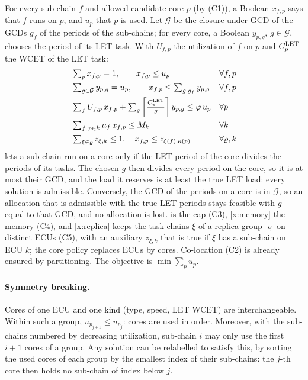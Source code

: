For every sub-chain $f$ and allowed candidate core $p$ (by (C1)), a Boolean
$x_{f,p}$ says that $f$ runs on $p$, and $u_p$ that $p$ is used. Let
$\mathcal{G}$ be the closure under GCD of the GCDs $g_f$ of the periods of
the sub-chains; for every core, a Boolean $y_{p,g}$, $g\in\mathcal{G}$,
chooses the period of its LET task. With $U_{f,p}$ the utilization of $f$
on $p$ and $C^{\mathrm{LET}}_p$ the WCET of the LET task:
\begin{align}
&\textstyle\sum_{p}x_{f,p}=1, \qquad x_{f,p}\le u_p &&\forall f,p\label{x:assign}\\
&\textstyle\sum_{g\in\mathcal{G}}y_{p,g}=u_p,\qquad
	x_{f,p}\le\sum_{g\mid g_f}y_{p,g} &&\forall f,p\label{x:let}\\
&\textstyle\sum_{f}U_{f,p}\,x_{f,p}+\sum_{g}\left\lceil \frac{C^{\mathrm{LET}}_p}{g} \right\rceil y_{p,g}
	\le\varphi\,u_p &&\forall p\label{x:load}\\
&\textstyle\sum_{f,\,p\in k}\mu_f\,x_{f,p}\le M_k &&\forall k\label{x:memory}\\
&\textstyle\sum_{\xi\in\varrho}z_{\xi,k}\le1,\quad x_{f,p}\le z_{\xi(f),\kappa(p)}
	&&\forall\varrho,k\label{x:replica}
\end{align}
 lets a sub-chain run on a core only if the LET period of the
core divides the periods of its tasks. The chosen $g$ then divides every
period on the core, so it is at most their GCD, and the load it reserves is
at least the true LET load: every solution is admissible. Conversely, the
GCD of the periods on a core is in $\mathcal{G}$, so an allocation that is
admissible with the true LET periods stays feasible with $g$ equal to that
GCD, and no allocation is lost.  is the cap (C3), \cref{x:memory} the
memory (C4), and \cref{x:replica} keeps the task-chains $\xi$ of a replica
group $\varrho$ on distinct ECUs (C5), with an auxiliary $z_{\xi,k}$ that is
true if $\xi$ has a sub-chain on ECU $k$; the core policy replaces ECUs by
cores. Co-location (C2) is already ensured by partitioning. The objective
is $\min\sum_p u_p$.

\paragraph{Symmetry breaking.} Cores of one ECU and one kind (type, speed,
LET WCET) are interchangeable. Within such a group, $u_{p_{j+1}}\le u_{p_j}$:
cores are used in order. Moreover, with the sub-chains numbered by
decreasing utilization, sub-chain $i$ may only use the first $i+1$ cores of
a group. Any solution can be relabelled to satisfy this, by sorting the
used cores of each group by the smallest index of their sub-chains: the
$j$-th core then holds no sub-chain of index below $j$.

